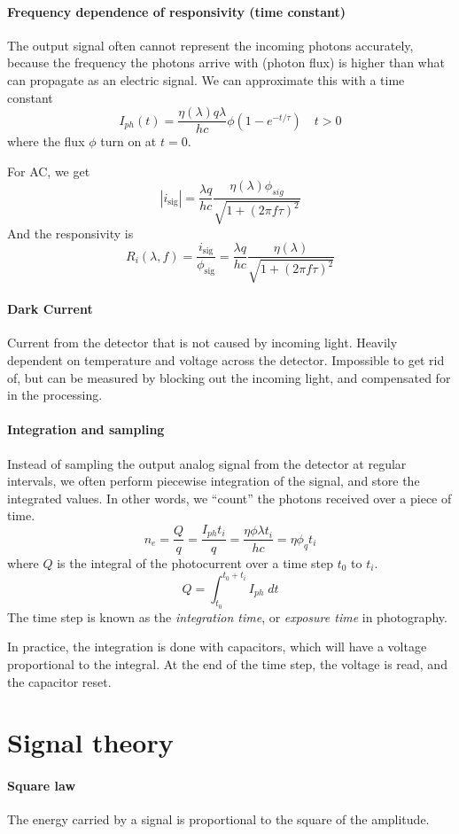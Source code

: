 \documentclass[article]{memoir}
\begin{document}
\paragraph{Frequency dependence of responsivity (time constant)}
The output signal often cannot represent the incoming photons accurately, because the frequency the photons arrive with (photon flux) is higher than what can propagate as an electric signal. We can approximate this with a time constant
\[
    I_{ph}(t) = \frac{\eta(\lambda)q\lambda}{hc}\phi\left(1 - e^{-t/\tau}\right) \quad t > 0
\]
where the flux \(\phi\) turn on at \(t=0\).

For AC, we get
\[
    |i_{\text{sig}}| = \frac{\lambda q}{h c} \frac{\eta(\lambda) \phi_{sig}}{\sqrt{1 + (2\pi f \tau)^2}}
\]
And the responsivity is
\[
    R_i(\lambda, f) = \frac{i_{\text{sig}}}{\phi_{\text{sig}}} =  \frac{\lambda q}{h c} \frac{\eta(\lambda) }{\sqrt{1 + (2\pi f \tau)^2}}
\]
\paragraph{Dark Current}
Current from the detector that is not caused by incoming light. Heavily dependent on temperature and voltage across the detector. Impossible to get rid of, but can be measured by blocking out the incoming light, and compensated for in the processing.

\paragraph{Integration and sampling}
Instead of sampling the output analog signal from the detector at regular intervals, we often perform piecewise integration of the signal, and store the integrated values. In other words, we ``count'' the photons received over a piece of time.
\[
    n_e = \frac{Q}{q} = \frac{I_{ph} t_i}{q} = \frac{\eta \phi \lambda t_i}{hc} = \eta \phi_q t_i
\]
where \(Q\) is the integral of the photocurrent over a time step \(t_0\) to \(t_i\).
\[
    Q = \int_{t_0}^{t_0+t_i} I_{ph} \; dt
\]
The time step is known as the \emph{integration time}, or \emph{exposure time} in photography.

In practice, the integration is done with capacitors, which will have a voltage proportional to the integral. At the end of the time step, the voltage is read, and the capacitor reset. 

\section{Signal theory}

\paragraph{Square law}
The energy carried by a signal is proportional to the square of the amplitude.
\end{document}
